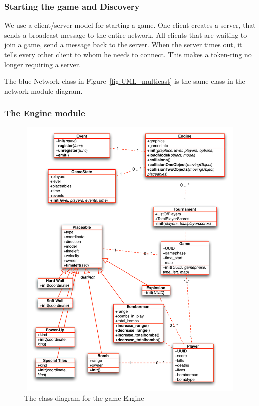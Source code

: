         \subsubsection{Starting the game and Discovery} %
        \label{ssub:starting_the_game_and_discovery}
            We use a client/server model for starting a game. One client creates a server, that sends a broadcast message to the entire network. All clients that are waiting to join a game, send a message back to the server. When the server times out, it tells every other client to whom he needs to connect. This makes a token-ring no longer requiring a server.

       The blue Network class in Figure~\ref{fig:UML_multicast} is the same class in the network module diagram.


    \subsubsection{The Engine module} %
    \label{ssub:the_engine_module}

      \begin{figure}[!ht]
        \centering
        \includegraphics[width=12cm,height=14cm]{diagrams/UML_engine}
        \caption{The class diagram for the game Engine} \label{fig:UML_engine}
      \end{figure}

